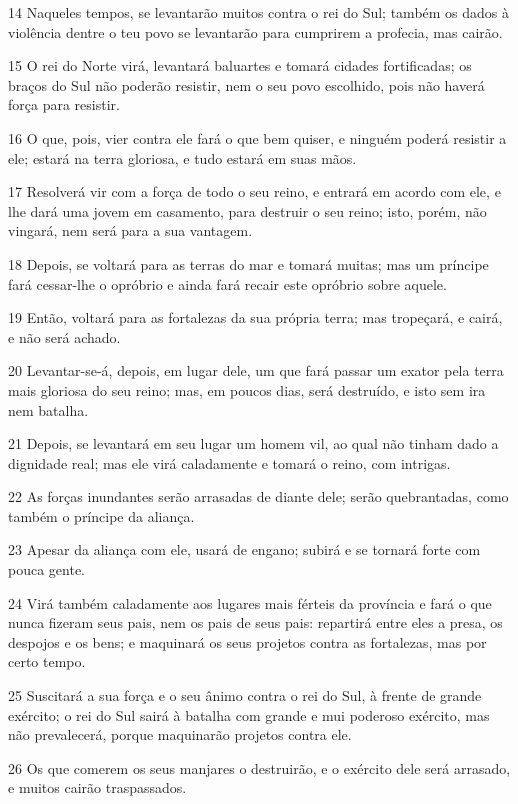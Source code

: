 \par 14 Naqueles tempos, se levantarão muitos contra o rei do Sul; também os dados à violência dentre o teu povo se levantarão para cumprirem a profecia, mas cairão.
\par 15 O rei do Norte virá, levantará baluartes e tomará cidades fortificadas; os braços do Sul não poderão resistir, nem o seu povo escolhido, pois não haverá força para resistir.
\par 16 O que, pois, vier contra ele fará o que bem quiser, e ninguém poderá resistir a ele; estará na terra gloriosa, e tudo estará em suas mãos.
\par 17 Resolverá vir com a força de todo o seu reino, e entrará em acordo com ele, e lhe dará uma jovem em casamento, para destruir o seu reino; isto, porém, não vingará, nem será para a sua vantagem.
\par 18 Depois, se voltará para as terras do mar e tomará muitas; mas um príncipe fará cessar-lhe o opróbrio e ainda fará recair este opróbrio sobre aquele.
\par 19 Então, voltará para as fortalezas da sua própria terra; mas tropeçará, e cairá, e não será achado.
\par 20 Levantar-se-á, depois, em lugar dele, um que fará passar um exator pela terra mais gloriosa do seu reino; mas, em poucos dias, será destruído, e isto sem ira nem batalha.
\par 21 Depois, se levantará em seu lugar um homem vil, ao qual não tinham dado a dignidade real; mas ele virá caladamente e tomará o reino, com intrigas.
\par 22 As forças inundantes serão arrasadas de diante dele; serão quebrantadas, como também o príncipe da aliança.
\par 23 Apesar da aliança com ele, usará de engano; subirá e se tornará forte com pouca gente.
\par 24 Virá também caladamente aos lugares mais férteis da província e fará o que nunca fizeram seus pais, nem os pais de seus pais: repartirá entre eles a presa, os despojos e os bens; e maquinará os seus projetos contra as fortalezas, mas por certo tempo.
\par 25 Suscitará a sua força e o seu ânimo contra o rei do Sul, à frente de grande exército; o rei do Sul sairá à batalha com grande e mui poderoso exército, mas não prevalecerá, porque maquinarão projetos contra ele.
\par 26 Os que comerem os seus manjares o destruirão, e o exército dele será arrasado, e muitos cairão traspassados.
